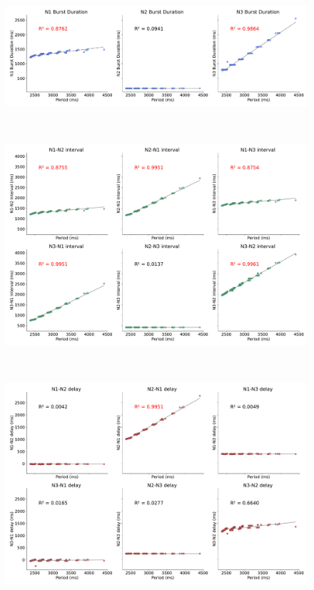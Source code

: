 \begin{figure}[hbt!]
\begin{minipage}[b]{0.45\textwidth}
	\end{minipage}
	\begin{minipage}[b]{0.53\textwidth}
		\centering
		\begin{minipage}[b]{\textwidth}
			\centering
			\includegraphics[width=\textwidth]{invariants/data/MODEL/n1m_driven/images/3phases/_durations.pdf}
		\end{minipage}\
		\begin{minipage}[b]{\textwidth}
			\centering
			\includegraphics[width=\textwidth]{invariants/data/MODEL/n1m_driven/images/3phases/_intervals.pdf}
		\end{minipage}\
		\begin{minipage}[b]{\textwidth}
			\centering
			\includegraphics[width=\textwidth]{invariants/data/MODEL/n1m_driven/images/3phases/_delays.pdf}

\end{minipage}
\end{minipage}
\end{figure}
